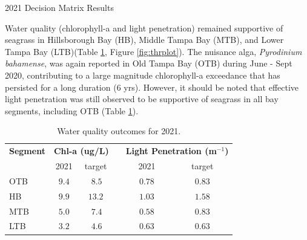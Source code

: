 \documentclass[final,t]{beamer}\usepackage[]{graphicx}\usepackage[]{color}
\begin{document}
\begin{frame}
\begin{columns}[t]
\begin{column}{.79\linewidth}
\begin{block}{2021 Decision Matrix Results}
\vspace{-0.1in}
\begin{minipage}{0.45\textwidth}
\footnotesize
Water quality (chlorophyll-a and light penetration) remained supportive of seagrass in Hillsborough Bay (HB), Middle Tampa Bay (MTB), and Lower Tampa Bay (LTB)(Table \ref{tab:segtab}, Figure \ref{fig:thrplot}). The nuisance alga, \textit{Pyrodinium bahamense}, was again reported in Old Tampa Bay (OTB) during June - Sept 2020, contributing to a large magnitude chlorophyll-a exceedance that has persisted for a long duration (6 yrs). However, it should be noted that effective light penetration was still observed to be supportive of seagrass in all bay segments, including OTB (Table \ref{tab:segtab}).
\end{minipage}
\hspace{0.1in}
\begin{minipage}{0.5\textwidth}
\footnotesize
\begin{table}[!tbp]
\caption{{\footnotesize Water quality outcomes for 2021.}\label{tab:segtab}} 
\begin{center}
\begin{tabular}{lccccc}
\hline\hline
\multicolumn{1}{l}{\bfseries Segment}&\multicolumn{2}{c}{\bfseries Chl-a (ug/L)}&\multicolumn{1}{c}{\bfseries }&\multicolumn{2}{c}{\bfseries Light Penetration (m$^{-1}$)}\tabularnewline
\cline{2-3} \cline{5-6}
\multicolumn{1}{l}{}&\multicolumn{1}{c}{2021}&\multicolumn{1}{c}{target}&\multicolumn{1}{c}{}&\multicolumn{1}{c}{2021}&\multicolumn{1}{c}{target}\tabularnewline
\hline
\cellcolor{yellow}OTB&$9.4$&$~8.5$&&$0.78$&$0.83$\tabularnewline
\cellcolor{green}HB&$9.9$&$13.2$&&$1.03$&$1.58$\tabularnewline
\cellcolor{green}MTB&$5.0$&$~7.4$&&$0.58$&$0.83$\tabularnewline
\cellcolor{green}LTB&$3.2$&$~4.6$&&$0.63$&$0.63$\tabularnewline
\hline
\end{tabular}\end{center}
\end{table}

\end{minipage}

\end{block}

\vspace{-0.55in}


\end{column}
\end{columns}
\end{frame}
\end{document}
